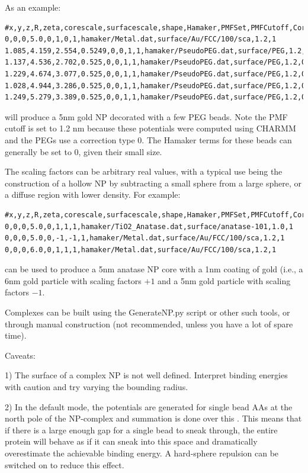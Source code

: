 \documentclass[10pt,a4paper,onecolumn]{report}
\begin{document}
As an example:
\begin{lstlisting}
#x,y,z,R,zeta,corescale,surfacescale,shape,Hamaker,PMFSet,PMFCutoff,Correction
0,0,0,5.0,0,1,0,1,hamaker/Metal.dat,surface/Au/FCC/100/sca,1.2,1
1.085,4.159,2.554,0.5249,0,0,1,1,hamaker/PseudoPEG.dat,surface/PEG,1.2,0
1.137,4.536,2.702,0.525,0,0,1,1,hamaker/PseudoPEG.dat,surface/PEG,1.2,0
1.229,4.674,3.077,0.525,0,0,1,1,hamaker/PseudoPEG.dat,surface/PEG,1.2,0
1.028,4.944,3.286,0.525,0,0,1,1,hamaker/PseudoPEG.dat,surface/PEG,1.2,0
1.249,5.279,3.389,0.525,0,0,1,1,hamaker/PseudoPEG.dat,surface/PEG,1.2,0
\end{lstlisting}
will produce a 5nm gold NP decorated with a few PEG beads. Note the PMF cutoff is set to 1.2 nm because these potentials were computed using CHARMM and the PEGs use a correction type 0. The Hamaker terms for these beads can generally be set to 0, given their small size. 




The scaling factors can be arbitrary real values, with a typical use being the construction of a hollow NP by subtracting a small sphere from a large sphere, or a diffuse region with lower density. For example:
\begin{lstlisting}
#x,y,z,R,zeta,corescale,surfacescale,shape,Hamaker,PMFSet,PMFCutoff,Correction
0,0,0,5.0,0,1,1,1,hamaker/TiO2_Anatase.dat,surface/anatase-101,1.0,1
0,0,0,5.0,0,-1,-1,1,hamaker/Metal.dat,surface/Au/FCC/100/sca,1.2,1
0,0,0,6.0,0,1,1,1,hamaker/Metal.dat,surface/Au/FCC/100/sca,1.2,1
\end{lstlisting}
can be used to produce a 5nm anatase NP core with a 1nm coating of gold (i.e., a 6nm gold particle with scaling factors $+1$ and a 5nm gold particle with scaling factors $-1$. 


Complexes can be built using the GenerateNP.py script or other such tools, or through manual construction (not recommended, unless you have a lot of spare time). 

Caveats:

1) The surface of a complex NP is not well defined. Interpret binding energies with caution and try varying the bounding radius. 

2) In the default mode, the potentials are generated for single bead AAs at the north pole of the NP-complex and summation is done over this . This means that if there is a large enough gap for a single bead to sneak through, the entire protein will behave as if it can sneak into this space and dramatically overestimate the achievable binding energy. A hard-sphere repulsion can be switched on to reduce this effect.
\end{document}
